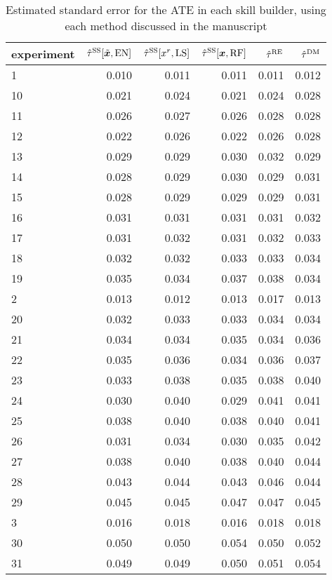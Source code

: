 \documentclass[12pt]{article}\usepackage[]{graphicx}\usepackage[]{xcolor}
\begin{document}
\begin{table}
\caption{\label{tab:tab:SEs}Estimated standard error for the ATE in each skill builder, using each method discussed in the manuscript}
\centering
\begin{tabular}[t]{l|r|r|r|r|r}
\hline
experiment & $\hat{\tau}^{\mathrm{SS}}[{\tilde{\bm{x}}}, \mathrm{EN}]$ & $\hat{\tau}^{\mathrm{SS}}[x^r, \mathrm{LS}]$ & $\hat{\tau}^{\mathrm{SS}}[{\bm{x}},\mathrm{RF}]$ & $\hat{\tau}^{\mathrm{RE}}$ & $\hat{\tau}^{\mathrm{DM}}$\\
\hline
1 & 0.010 & 0.011 & 0.011 & 0.011 & 0.012\\
\hline
10 & 0.021 & 0.024 & 0.021 & 0.024 & 0.028\\
\hline
11 & 0.026 & 0.027 & 0.026 & 0.028 & 0.028\\
\hline
12 & 0.022 & 0.026 & 0.022 & 0.026 & 0.028\\
\hline
13 & 0.029 & 0.029 & 0.030 & 0.032 & 0.029\\
\hline
14 & 0.028 & 0.029 & 0.030 & 0.029 & 0.031\\
\hline
15 & 0.028 & 0.029 & 0.029 & 0.029 & 0.031\\
\hline
16 & 0.031 & 0.031 & 0.031 & 0.031 & 0.032\\
\hline
17 & 0.031 & 0.032 & 0.031 & 0.032 & 0.033\\
\hline
18 & 0.032 & 0.032 & 0.033 & 0.033 & 0.034\\
\hline
19 & 0.035 & 0.034 & 0.037 & 0.038 & 0.034\\
\hline
2 & 0.013 & 0.012 & 0.013 & 0.017 & 0.013\\
\hline
20 & 0.032 & 0.033 & 0.033 & 0.034 & 0.034\\
\hline
21 & 0.034 & 0.034 & 0.035 & 0.034 & 0.036\\
\hline
22 & 0.035 & 0.036 & 0.034 & 0.036 & 0.037\\
\hline
23 & 0.033 & 0.038 & 0.035 & 0.038 & 0.040\\
\hline
24 & 0.030 & 0.040 & 0.029 & 0.041 & 0.041\\
\hline
25 & 0.038 & 0.040 & 0.038 & 0.040 & 0.041\\
\hline
26 & 0.031 & 0.034 & 0.030 & 0.035 & 0.042\\
\hline
27 & 0.038 & 0.040 & 0.038 & 0.040 & 0.044\\
\hline
28 & 0.043 & 0.044 & 0.043 & 0.046 & 0.044\\
\hline
29 & 0.045 & 0.045 & 0.047 & 0.047 & 0.045\\
\hline
3 & 0.016 & 0.018 & 0.016 & 0.018 & 0.018\\
\hline
30 & 0.050 & 0.050 & 0.054 & 0.050 & 0.052\\
\hline
31 & 0.049 & 0.049 & 0.050 & 0.051 & 0.054\\

\end{tabular}
\end{table}
\end{document}
